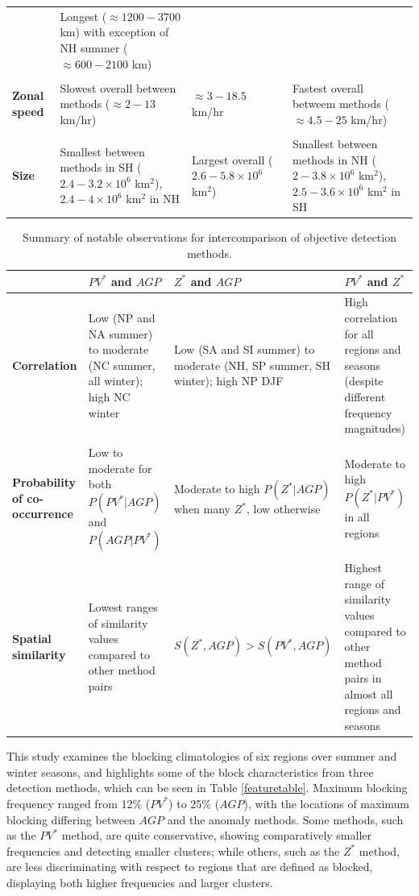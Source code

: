 \documentclass[smallextended]{svjour3}       %
\numberwithin{equation}{section}
\begin{document}
\begin{table}
\begin{tabular}[t]{|L{0.18\textwidth}|L{0.27\textwidth}|L{0.27\textwidth}|L{0.27\textwidth}|}
& Longest ($\approx 1200-3700$ km) with exception of NH summer ($\approx 600-2100$ km)\\
&&&\\
\textbf{Zonal speed}
& Slowest overall between methods ($\approx 2-13$ km/hr)
& $\approx 3-18.5$ km/hr
& Fastest overall betweem methods ($\approx4.5-25$ km/hr)\\
&&&\\
\textbf{Size}
& Smallest between methods in SH ($2.4-3.2\times 10^6$ km$^2$), $2.4-4\times 10^6$ km$^2$ in NH
& Largest overall ($2.6-5.8\times 10^6$ km$^2$)
& Smallest between methods in NH ($2-3.8\times 10^6$ km$^2$), $2.5-3.6\times 10^6$ km$^2$ in SH\\
\hline
\end{tabular}
\end{table}

\begin{table}
\caption{Summary of notable observations for intercomparison of objective detection methods.} \label{inttable}
\begin{tabular}[t]{|L{0.18\textwidth}|L{0.27\textwidth}|L{0.27\textwidth}|L{0.27\textwidth}|}\hline
 &$PV^*$ and $AGP$& $Z^*$ and $AGP$ & $PV^*$ and $Z^*$\\
\hline
\textbf{Correlation }
& Low (NP and NA summer) to moderate (NC summer, all winter); high NC winter
& Low (SA and SI summer)  to moderate (NH, SP summer, SH winter); high NP DJF
& High correlation for all regions and seasons (despite different frequency magnitudes)\\
&&&\\
\textbf{Probability of co-occurrence}
& Low to moderate for both $P(PV^*|AGP)$ and $P(AGP|PV^*)$
& Moderate to high $P(Z^*|AGP)$ when many $Z^*$, low otherwise
& Moderate to high $P(Z^*|PV^*)$ in all regions\\
&&&\\
\textbf{Spatial similarity}
& Lowest ranges of similarity values compared to other method pairs
& $S(Z^*,AGP)>S(PV^*,AGP)$
&Highest range of similarity values compared to other method pairs in almost all regions and seasons\\

\hline
\end{tabular}
\end{table}

This study examines the blocking climatologies of six regions over summer and winter seasons, and highlights some of the block characteristics from three detection methods, which can be seen in Table \ref{featuretable}. Maximum blocking frequency ranged from 12\% ($PV^*$) to 25\% ($AGP$), with the locations of maximum blocking differing between $AGP$ and the anomaly methods. Some methods, such as the $PV^*$ method, are quite conservative, showing comparatively smaller frequencies and detecting smaller clusters; while others, such as the $Z^*$ method, are less discriminating with respect to regions that are defined as blocked, displaying both higher frequencies and larger clusters. 
\end{document}
